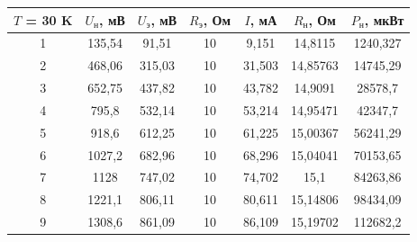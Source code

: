 \documentclass[a4paper, 12pt]{article} %
\begin{document}
\begin{center}
\begin{tabular}{|c|c|c|c|c|c|c|}
\hline
\textbf{$T$ = 30 K} & $U_\text{н}$, мВ & $U_\text{э}$, мВ & $R_\text{э}$, Ом & $I$, мА & $R_\text{н}$, Ом & $P_\text{н}$, мкВт \\ \hline
1                   & 135,54           & 91,51           & 10               & 9,151   & 14,8115          & 1240,327         \\ \hline
2                   & 468,06           & 315,03          & 10               & 31,503  & 14,85763         & 14745,29         \\ \hline
3                   & 652,75           & 437,82          & 10               & 43,782  & 14,9091          & 28578,7          \\ \hline
4                   & 795,8            & 532,14          & 10               & 53,214  & 14,95471         & 42347,7          \\ \hline
5                   & 918,6            & 612,25          & 10               & 61,225  & 15,00367         & 56241,29         \\ \hline
6                   & 1027,2           & 682,96          & 10               & 68,296  & 15,04041         & 70153,65         \\ \hline
7                   & 1128             & 747,02          & 10               & 74,702  & 15,1             & 84263,86         \\ \hline
8                   & 1221,1           & 806,11          & 10               & 80,611  & 15,14806         & 98434,09         \\ \hline
9                   & 1308,6           & 861,09          & 10               & 86,109  & 15,19702         & 112682,2         \\ \hline
\end{tabular}
\end{center}
\end{document}
